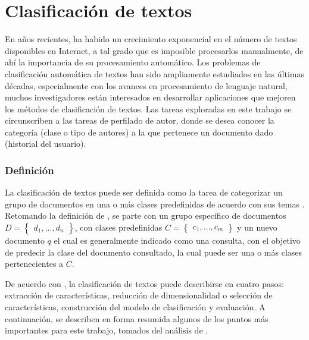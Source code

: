 \section{Clasificación de textos}

En años recientes, ha habido un crecimiento exponencial en el número de textos disponibles en Internet, a tal grado que es imposible procesarlos manualmente, de ahí la importancia de su procesamiento automático. Los problemas de clasificación automática de textos han sido ampliamente estudiados en las últimas décadas, especialmente con los avances en procesamiento de lenguaje natural, muchos investigadores están interesados en desarrollar aplicaciones que mejoren los métodos de clasificación de textos. Las tareas exploradas en este trabajo se circunscriben a las tareas de perfilado de autor, donde se desea conocer la categoría (clase o tipo de autores) a la que pertenece un documento dado (historial del usuario).

\subsubsection{Definición}

La clasificación de textos puede ser definida como la tarea de categorizar un grupo de documentos en una o más clases predefinidas de acuerdo con sus temas \citep{Kadhim2019}. Retomando la definición de \citep{Kadhim2019}, se parte con un grupo específico de documentos $D={\begin{Bmatrix} d_1 , ... , d_n \end{Bmatrix}}$, con clases predefinidas $C={\begin{Bmatrix} c_1 , ... , c_m \end{Bmatrix}}$ y un nuevo documento $q$ el cual es generalmente indicado como una consulta, con el objetivo de predecir la clase del documento consultado, la cual puede ser una o más clases pertenecientes a $C$.

De acuerdo con \citep{kowsari2019text}, la clasificación de textos puede describirse en cuatro pasos: extracción de características, reducción de dimensionalidad o selección de características, construcción del modelo de clasificación y evaluación. A continuación, se describen en forma resumida algunos de los puntos más importantes para este trabajo, tomados del análisis de \citep{kowsari2019text}.

